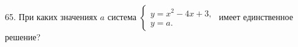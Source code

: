 65. При каких значениях $a$ система $\begin{cases} y=x^2-4x+3,\\ y=a.\end{cases}$ имеет единственное решение?\\
